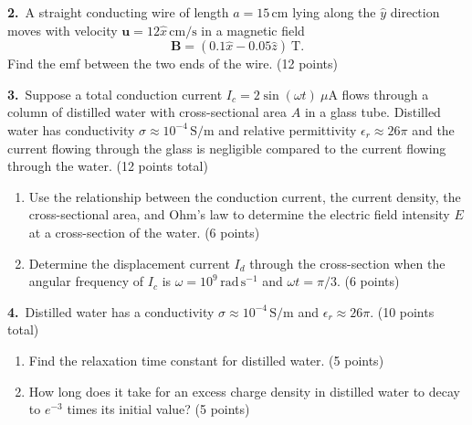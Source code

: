 \documentclass[12pt,letterpaper]{article}
\begin{document}
\newpage

\textbf{2.}\ A straight conducting wire of length $a = 15\,\mathrm{cm}$ lying along the
$\hat{y}$ direction moves with velocity $\mathbf{u} = 12\hat{x}\,\mathrm{cm/s}$ in a
magnetic field
\[
  \mathbf{B} = (0.1\hat{x} - 0.05\hat{z})\ \mathrm{T}.
\]
Find the emf between the two ends of the wire. \hfill(12 points)

\vspace{13cm}

\textbf{3.}\ Suppose a total conduction current $I_c = 2\sin(\omega t)\ \mu\mathrm{A}$ flows
through a column of distilled water with cross-sectional area $A$ in a glass tube.
Distilled water has conductivity $\sigma \approx 10^{-4}\,\mathrm{S/m}$ and relative
permittivity $\epsilon_r \approx 26\pi$ and the current flowing through the glass is
negligible compared to the current flowing through the water. (12 points total)

\begin{enumerate}[label=(\alph*), leftmargin=2.5cm]

  \item Use the relationship between the conduction current, the current density, the
        cross-sectional area, and Ohm's law to determine the electric field intensity
        $E$ at a cross-section of the water.
        \hfill(6 points)
  \vspace{5.5cm}

  \item Determine the displacement current $I_d$ through the cross-section when the
        angular frequency of $I_c$ is $\omega = 10^9\,\mathrm{rad\,s^{-1}}$ and
        $\omega t = \pi/3$.
        \hfill(6 points)
  \vspace{5.5cm}

\end{enumerate}

\newpage

\textbf{4.}\ Distilled water has a conductivity $\sigma \approx 10^{-4}\,\mathrm{S/m}$
and $\epsilon_r \approx 26\pi$. (10 points total)

\begin{enumerate}[label=(\alph*), leftmargin=2.5cm]

  \item Find the relaxation time constant for distilled water.
        \hfill(5 points)
  \vspace{7cm}

  \item How long does it take for an excess charge density in distilled water to decay
        to $e^{-3}$ times its initial value?
        \hfill(5 points)
  \vspace{7cm}

\end{enumerate}
\end{document}
